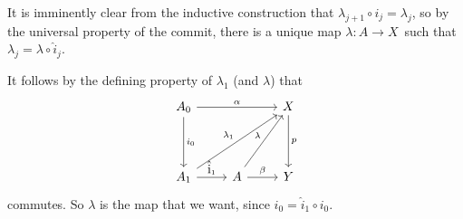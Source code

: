 \begin{exercise}[1]
\begin{enumerate}
It is imminently clear from the inductive construction that $\lambda_{j+1}
\circ i_j = \lambda_j$, so by the universal property of the commit, 
there is a unique map $\lambda : A \to X$ such that 
$\lambda_j = \lambda \circ \hat i_j$.

It follows by the defining property of $\lambda_1$ (and $\lambda$) that 
\[ \begin{tikzcd}[row sep = 4em]
A_0 \ar[rr,"\alpha"] \ar[d, "i_0"] &
& X \ar[d, "p"] \\
A_1 \ar[r, "\hat i_1"] \ar[rru, "\lambda_1"]
& A \ar[r, "\beta"] \ar[ru, "\lambda"]
& Y
\end{tikzcd} \]
commutes. So $\lambda$ is the map that we want, since $\hat i_0 = \hat i_1
\circ i_0$.


\end{enumerate}



\end{exercise}


